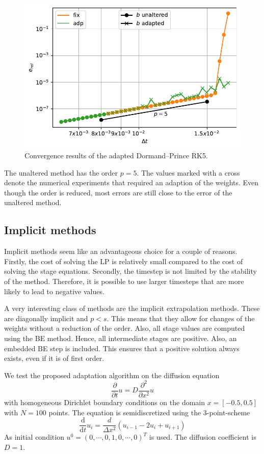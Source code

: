 \documentclass[a4paper]{article}
\numberwithin{equation}{section}
\theoremstyle{plain}
\theoremstyle{definition}
\numberwithin{theorem}{section}
\newcommand{\1}{\mathbbm{1}}
\begin{document}
\begin{figure}[ht]
\centering
\includegraphics[scale=0.6]{plots/conv_adde.pdf}
\caption{Convergence results of the adapted Dormand--Prince RK5.}
\label{fig:conv_expl}
\end{figure}

The unaltered method has the order $p=5$. 
The values marked with a cross denote the numerical experiments that required an adaption of the weights. 
Even though the order is reduced, most errors are still close to the error of the unaltered method.

\subsection{Implicit methods}
Implicit methods seem like an advantageous choice for a couple of reasons. 
Firstly, the cost of solving the LP is relatively small compared to the cost of solving the stage equations.
Secondly, the timestep is not limited by the stability of the method.
Therefore, it is possible to use larger timesteps that are more likely to lead to negative values.

A very interesting class of methods are the implicit extrapolation methods. These are diagonally implicit and $p < s$. This means that they allow for changes of the weights without a reduction of the order.
Also, all stage values are computed using the BE method. Hence, all intermediate stages are positive.
Also, an embedded BE step is included. This ensures that a positive solution always exists, even if it is of first order.

We test the proposed adaptation algorithm on the diffusion equation
\begin{equation}
\frac{\partial }{\partial t} u = D \frac{\partial^2}{\partial x^2} u
\end{equation}
with homogeneous Dirichlet boundary conditions on the domain $x = [-0.5,0.5]$ with $N=100$ points. The equation is semidiscretized using the 3-point-scheme
\begin{equation}
\frac{\mathrm d}{\mathrm d t} u_i = \frac{d}{\Delta x^2} \left( u_{i-1} - 2u_i + u_{i+1} \right)
\end{equation}
As initial condition $u^0 = (0,\cdots,0,1,0,\cdots,0)^T$ is used. The diffusion coefficient is $D=1$.
\end{document}
